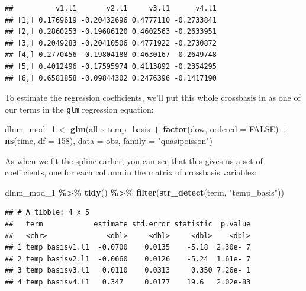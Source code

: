 \documentclass[
]{book}
\newenvironment{Shaded}{\begin{snugshade}}{\end{snugshade}}
\newcommand{\AttributeTok}[1]{\textcolor[rgb]{0.13,0.29,0.53}{#1}}
\newcommand{\ConstantTok}[1]{\textcolor[rgb]{0.56,0.35,0.01}{#1}}
\newcommand{\DecValTok}[1]{\textcolor[rgb]{0.00,0.00,0.81}{#1}}
\newcommand{\FunctionTok}[1]{\textcolor[rgb]{0.13,0.29,0.53}{\textbf{#1}}}
\newcommand{\NormalTok}[1]{#1}
\newcommand{\OtherTok}[1]{\textcolor[rgb]{0.56,0.35,0.01}{#1}}
\newcommand{\SpecialCharTok}[1]{\textcolor[rgb]{0.81,0.36,0.00}{\textbf{#1}}}
\newcommand{\StringTok}[1]{\textcolor[rgb]{0.31,0.60,0.02}{#1}}
\begin{document}
\begin{verbatim}
##          v1.l1       v2.l1     v3.l1      v4.l1
## [1,] 0.1769619 -0.20432696 0.4777110 -0.2733841
## [2,] 0.2860253 -0.19686120 0.4602563 -0.2633951
## [3,] 0.2049283 -0.20410506 0.4771922 -0.2730872
## [4,] 0.2770456 -0.19804188 0.4630167 -0.2649748
## [5,] 0.4012496 -0.17595974 0.4113892 -0.2354295
## [6,] 0.6581858 -0.09844302 0.2476396 -0.1417190
\end{verbatim}

To estimate the regression coefficients, we'll put this whole crossbasis in as one of
our terms in the \texttt{glm} regression equation:

\begin{Shaded}
\begin{Highlighting}[]
\NormalTok{dlnm\_mod\_1 }\OtherTok{\textless{}{-}} \FunctionTok{glm}\NormalTok{(all }\SpecialCharTok{\textasciitilde{}}\NormalTok{ temp\_basis }\SpecialCharTok{+} \FunctionTok{factor}\NormalTok{(dow, }\AttributeTok{ordered =} \ConstantTok{FALSE}\NormalTok{) }\SpecialCharTok{+}
                          \FunctionTok{ns}\NormalTok{(time, }\AttributeTok{df =} \DecValTok{158}\NormalTok{), }
                        \AttributeTok{data =}\NormalTok{ obs, }\AttributeTok{family =} \StringTok{"quasipoisson"}\NormalTok{)}
\end{Highlighting}
\end{Shaded}

As when we fit the spline earlier, you can see that this gives us a set of coefficients,
one for each column in the matrix of crossbasis variables:

\begin{Shaded}
\begin{Highlighting}[]
\NormalTok{dlnm\_mod\_1 }\SpecialCharTok{\%\textgreater{}\%} 
  \FunctionTok{tidy}\NormalTok{() }\SpecialCharTok{\%\textgreater{}\%} 
  \FunctionTok{filter}\NormalTok{(}\FunctionTok{str\_detect}\NormalTok{(term, }\StringTok{"temp\_basis"}\NormalTok{))}
\end{Highlighting}
\end{Shaded}

\begin{verbatim}
## # A tibble: 4 x 5
##   term            estimate std.error statistic  p.value
##   <chr>              <dbl>     <dbl>     <dbl>    <dbl>
## 1 temp_basisv1.l1  -0.0700    0.0135    -5.18  2.30e- 7
## 2 temp_basisv2.l1  -0.0660    0.0126    -5.24  1.61e- 7
## 3 temp_basisv3.l1   0.0110    0.0313     0.350 7.26e- 1
## 4 temp_basisv4.l1   0.347     0.0177    19.6   2.02e-83
\end{verbatim}
\end{document}
